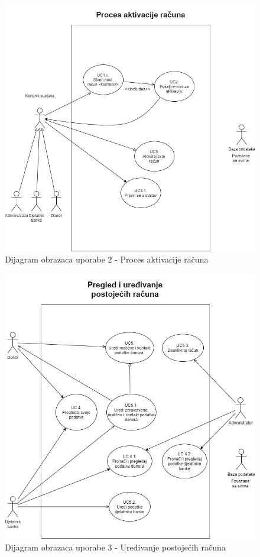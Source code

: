 				\begin{figure}[H]
    			\includegraphics[scale=0.6]{slike/UC2.png} %
    			\centering
    			\caption{Dijagram obrazaca uporabe 2 - Proces aktivacije računa}
    			\label{fig:promjene}
    	    	\end{figure}
    	    	
				\begin{figure}[H]
    			\includegraphics[scale=0.6]{slike/UC3.png} %
    			\centering
    			\caption{Dijagram obrazaca uporabe 3 - Uređivanje postojećih računa}
    			\label{fig:promjene}
    	    	\end{figure}
    	    	
